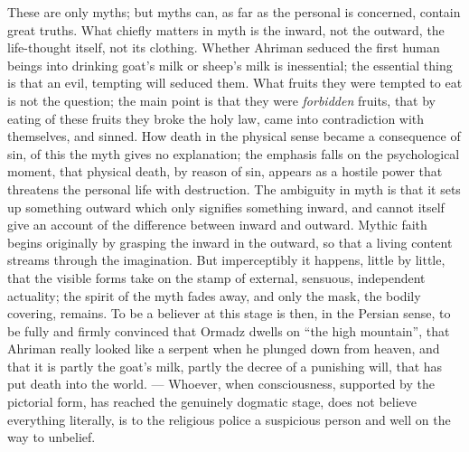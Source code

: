 \documentclass[12pt,a4paper,openany]{book}
\newcommand{\opage}[1]{\marginnote{\footnotesize\textit{[#1]}}}
\begin{document}
These are only myths; but myths can, as far as the personal is concerned, contain great truths.
What chiefly matters in myth is the inward, not the outward, the life-thought itself, not its
clothing. Whether Ahriman seduced the first human beings into drinking goat's milk or sheep's
milk is
\setcounter{footnote}{0}%
\opage{42}inessential; the essential thing is that an evil, tempting will seduced them. What
fruits they were tempted to eat is not the question; the main point is that they were
\emph{forbidden} fruits, that by eating of these fruits they broke the holy law, came into
contradiction with themselves, and sinned. How death in the physical sense became a
consequence of sin, of this the myth gives no explanation; the emphasis falls on the
psychological moment, that physical death, by reason of sin, appears as a hostile power that
threatens the personal life with destruction. The ambiguity in myth is that it sets up
something outward which only signifies something inward, and cannot itself give an account of
the difference between inward and outward. Mythic faith begins originally by grasping the
inward in the outward, so that a living content streams through the imagination. But
imperceptibly it happens, little by little, that the visible forms take on the stamp of
external, sensuous, independent actuality; the spirit of the myth fades away, and only the
mask, the bodily covering, remains. To be a believer at this stage is then, in the Persian
sense, to be fully and firmly convinced that Ormadz dwells on ``the high mountain'', that %
Ahriman really looked like a serpent when he plunged down from heaven, and that it is partly
the goat's milk, partly the decree of a punishing will, that has put death into the world. ---
Whoever, when consciousness, supported by the pictorial form, has reached the genuinely
dogmatic stage, does not believe everything literally, is to the religious police a suspicious
person and well on the way to unbelief.
\end{document}
